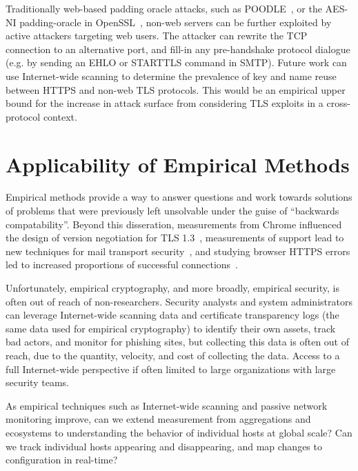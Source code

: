 Traditionally web-based padding oracle attacks, such as
POODLE~\cite{poodle-2014}, or the AES-NI padding-oracle in
OpenSSL~\cite{cve-2016-2107}, non-web servers can be further exploited by
active attackers targeting web users. The attacker can rewrite the TCP
connection to an alternative port, and fill-in any pre-handshake protocol
dialogue (e.g. by sending an EHLO or STARTTLS command in SMTP). Future work
can use Internet-wide scanning to determine the prevalence of key and name
reuse between HTTPS and non-web TLS protocols. This would be an empirical
upper bound for the increase in attack surface from considering TLS exploits
in a cross-protocol context.

\section{Applicability of Empirical Methods}

Empirical methods provide a way to answer questions and work towards
solutions of problems that were previously left unsolvable under the guise of
``backwards compatability''. Beyond this disseration, measurements from
Chrome influenced the design of version negotiation for TLS
1.3~\cite{why-tls-13-browsers-cloudflare}, measurements of \starttls support
lead to new techniques for mail transport
security~\cite{google-email-transparency-report,mail-2015,rfc8461}, and
studying browser HTTPS errors led to increased proportions of successful
connections~\cite{wild-warnings-2017}.

Unfortunately, empirical cryptography, and more broadly, empirical security,
is often out of reach of non-researchers. Security analysts and system
administrators can leverage Internet-wide scanning data and certificate
transparency logs (the same data used for empirical cryptography) to identify
their own assets, track bad actors, and monitor for phishing sites, but
collecting this data is often out of reach, due to the quantity, velocity,
and cost of collecting the data. Access to a full Internet-wide perspective
if often limited to large organizations with large security teams.

As empirical techniques such as Internet-wide scanning and passive network
monitoring improve, can we extend measurement from aggregations and
ecosystems to understanding the behavior of individual hosts at global scale?
Can we track individual hosts appearing and disappearing, and map changes to
configuration in real-time?

